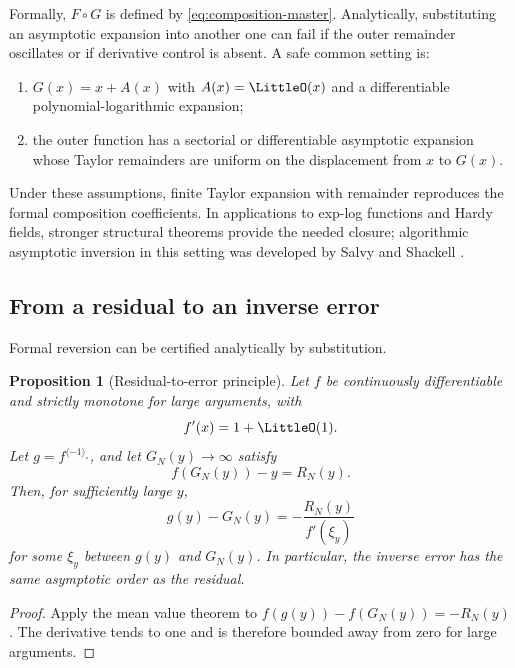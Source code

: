 \documentclass[11pt]{article}
\theoremstyle{pltheorem}
\newtheorem{proposition}[theorem]{Proposition}
\newcommand{\rev}{\langle-1\rangle_{\circ}}
\newcommand{\compose}{\mathbin{\circ}}
\begin{document}
Formally, \(F\compose G\) is defined by \cref{eq:composition-master}.  Analytically, substituting an asymptotic expansion into another one can fail if the outer remainder oscillates or if derivative control is absent.  A safe common setting is:
\begin{enumerate}
\item \(G(x)=x+A(x)\) with \(A(x)=\LittleO(x)\) and a differentiable polynomial-logarithmic expansion;
\item the outer function has a sectorial or differentiable asymptotic expansion whose Taylor remainders are uniform on the displacement from \(x\) to \(G(x)\).
\end{enumerate}
Under these assumptions, finite Taylor expansion with remainder reproduces the formal composition coefficients.  In applications to exp-log functions and Hardy fields, stronger structural theorems provide the needed closure; algorithmic asymptotic inversion in this setting was developed by Salvy and Shackell \cite{salvy-shackell-1999}.

\subsection{From a residual to an inverse error}

Formal reversion can be certified analytically by substitution.

\begin{proposition}[Residual-to-error principle]\label{prop:residual-to-error}
Let \(f\) be continuously differentiable and strictly monotone for large arguments, with
\begin{equation}\label{eq:fprime-to-one}
 f'(x)=1+\LittleO(1).
\end{equation}
Let \(g=f^{\rev}\), and let \(G_N(y)\to\infty\) satisfy
\begin{equation}\label{eq:inverse-residual-bound}
 f(G_N(y))-y=R_N(y).
\end{equation}
Then, for sufficiently large \(y\),
\begin{equation}\label{eq:inverse-error-bound}
 g(y)-G_N(y)=-\frac{R_N(y)}{f'(\xi_y)}
\end{equation}
for some \(\xi_y\) between \(g(y)\) and \(G_N(y)\).  In particular, the inverse error has the same asymptotic order as the residual.
\end{proposition}

\begin{proof}
Apply the mean value theorem to
\(f(g(y))-f(G_N(y))=-R_N(y)\).  The derivative tends to one and is therefore bounded away from zero for large arguments.
\end{proof}
\end{document}
